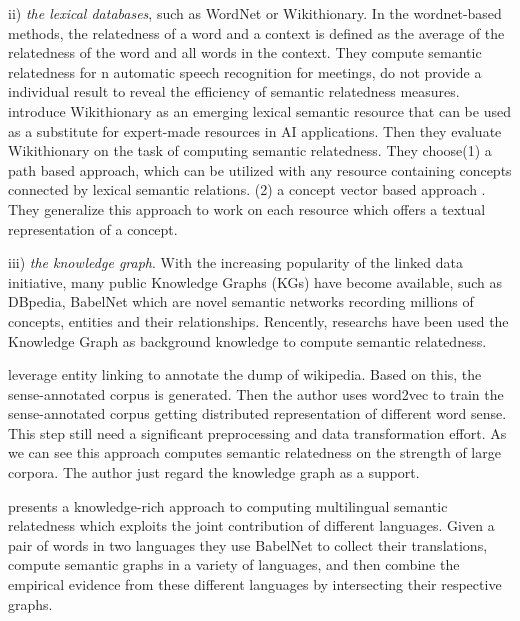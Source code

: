 ii) \emph{the lexical databases}, such as WordNet or Wikithionary. 
In the wordnet-based methods\cite{acl/Pucher07}, the relatedness of a word and a context is
defined as the average of the relatedness of the word and all words in the context. They compute
semantic relatedness for n automatic speech recognition for meetings, do not provide a individual result
to reveal the efficiency of semantic relatedness measures.
\cite{aaai/ZeschMG08} introduce Wikithionary as an emerging lexical semantic resource
that can be used as a substitute for expert-made resources in AI applications.
Then they evaluate Wikithionary on the task of computing semantic relatedness.
They choose(1) a path based approach\cite{its/Rada89}, which can be utilized with any
resource containing concepts connected by lexical semantic relations. (2) a concept vector based approach
\cite{ijcai/GabrilovichM07}. They generalize this approach to work on each
resource which offers a textual representation of a concept.

iii) \emph{the knowledge graph}. 
With the increasing popularity of the linked data initiative, many public Knowledge Graphs (KGs) have
become available, such as DBpedia, BabelNet which are novel semantic networks recording millions
of concepts, entities and their relationships. Rencently, researchs have been used the Knowledge Graph as
background knowledge to compute semantic relatedness. 

\cite{acl/IacobacciPN15} leverage entity linking to annotate the dump of wikipedia. Based on this,
the sense-annotated corpus is generated. Then the author uses word2vec to
train the sense-annotated corpus getting distributed representation of different 
word sense. This step still need a significant preprocessing and data transformation effort. 
As we can see this approach computes semantic relatedness on the strength of large corpora.
The author just regard the knowledge graph as a support. 

\cite{aaai/NavigliP12} presents a knowledge-rich approach to computing multilingual semantic
relatedness which exploits the joint contribution of different languages. Given a pair of words 
in two languages they use BabelNet to collect their translations, compute semantic
graphs in a variety of languages, and then combine the empirical evidence from these 
different languages by intersecting their respective graphs.

